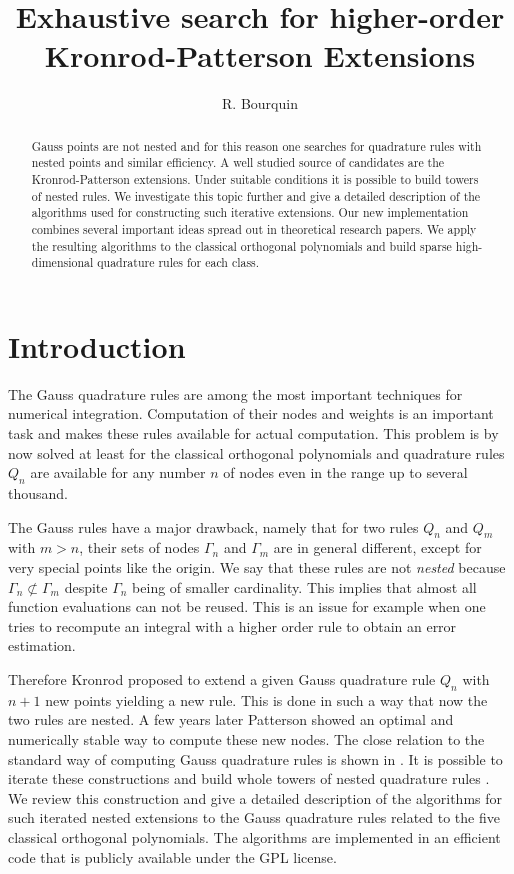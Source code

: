 \documentclass[a4paper,10pt]{article}
\title{Exhaustive search for higher-order Kronrod-Patterson Extensions}
\author{R. Bourquin}
\begin{document}
\maketitle

\begin{abstract}
  Gauss points are not nested and for this reason one searches
  for quadrature rules with nested points and similar efficiency.
  A well studied source of candidates are the Kronrod-Patterson
  extensions. Under suitable conditions it is possible to build
  towers of nested rules. We investigate this topic further and
  give a detailed description of the algorithms used for constructing
  such iterative extensions. Our new implementation combines several
  important ideas spread out in theoretical research papers. We
  apply the resulting algorithms to the classical orthogonal polynomials
  and build sparse high-dimensional quadrature rules for each class.
\end{abstract}


\section{Introduction}

The Gauss quadrature rules are among the most important techniques
for numerical integration. Computation of their nodes and weights
is an important task and makes these rules available for actual computation.
This problem is by now solved at least for the classical orthogonal
polynomials \cite{gautschi_opca,szegoe_op,opap} and quadrature rules $Q_n$
are available for any number $n$ of nodes even in the range up to several thousand.

The Gauss rules have a major drawback, namely that for two
rules $Q_n$ and $Q_m$ with $m > n$, their sets of nodes $\Gamma_n$
and $\Gamma_m$ are in general different, except for very special
points like the origin.
We say that these rules are not \emph{nested} because
$\Gamma_n \not\subset \Gamma_m$ despite $\Gamma_n$ being of smaller
cardinality. This implies that almost all function evaluations can
not be reused. This is an issue for example when one tries to recompute
an integral with a higher order rule to obtain an error estimation.

Therefore Kronrod proposed \cite{kronrod} to extend a given Gauss
quadrature rule $Q_n$ with $n+1$ new points yielding a new rule.
This is done in such a way that now the two rules are nested. A few
years later Patterson showed \cite{patterson1968} an optimal and
numerically stable way to compute these new nodes. The close relation to
the standard way of computing Gauss quadrature rules is shown in \cite{laurie}.
It is possible to iterate these constructions and build whole
towers of nested quadrature rules \cite{mehrotra-papp}. We review
this construction and give a detailed description of the algorithms for
such iterated nested extensions to the Gauss quadrature rules related
to the five classical orthogonal polynomials. The algorithms are implemented
in an efficient code that is publicly available under the GPL license.
\end{document}

